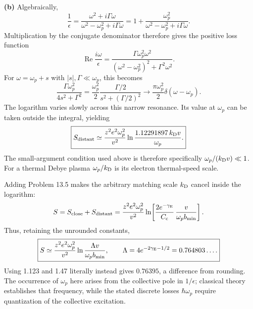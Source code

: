 \textbf{(b)} Algebraically,
\[
 \frac1{\epsilon}
 =\frac{\omega^2+i\Gamma\omega}
       {\omega^2-\omega_p^2+i\Gamma\omega}
 =1+\frac{\omega_p^2}{\omega^2-\omega_p^2+i\Gamma\omega}.
\]
Multiplication by the conjugate denominator therefore gives the
positive loss function
\[
 \operatorname{Re}\frac{i\omega}{\epsilon}
 =\frac{\Gamma\omega_p^2\omega^2}
 {(\omega^2-\omega_p^2)^2+\Gamma^2\omega^2}.
\]
For $\omega=\omega_p+s$ with $|s|,\Gamma\ll\omega_p$, this becomes
\[
 \frac{\Gamma\omega_p^2}{4s^2+\Gamma^2}
 =\frac{\omega_p^2}{2}
   \frac{\Gamma/2}{s^2+(\Gamma/2)^2}
 \longrightarrow\frac{\pi\omega_p^2}{2}\delta(\omega-\omega_p).
\]
The logarithm varies slowly across this narrow resonance. Its value at
$\omega_p$ can be taken outside the integral, yielding
\[
 \boxed{S_{\rm distant}\simeq
 \frac{z^2e^2\omega_p^2}{v^2}
 \ln\frac{1.12291897\,k_{\rm D}v}{\omega_p}.}
\]
The small-argument condition used above is therefore specifically
$\omega_p/(k_{\rm D}v)\ll1$. For a thermal Debye plasma
$\omega_p/k_{\rm D}$ is its electron thermal-speed scale.

Adding Problem 13.5 makes the arbitrary matching scale $k_{\rm D}$
cancel inside the logarithm:
\[
 S=S_{\rm close}+S_{\rm distant}
 =\frac{z^2e^2\omega_p^2}{v^2}
 \ln\!\left[\frac{2e^{-\gamma_{\rm E}}}{C_{\rm c}}\,
                 \frac{v}{\omega_pb_{\min}}\right].
\]
Thus, retaining the unrounded constants,
\[
 \boxed{S\simeq\frac{z^2e^2\omega_p^2}{v^2}
 \ln\frac{\Lambda v}{\omega_pb_{\min}},\qquad
 \Lambda=4e^{-2\gamma_{\rm E}-1/2}=0.764803\ldots .}
\]
Using 1.123 and 1.47 literally instead gives $0.76395$, a difference
from rounding. The occurrence of $\omega_p$ here arises from the
collective pole in $1/\epsilon$; classical theory establishes that
frequency, while the stated discrete losses $\hbar\omega_p$ require
quantization of the collective excitation.







